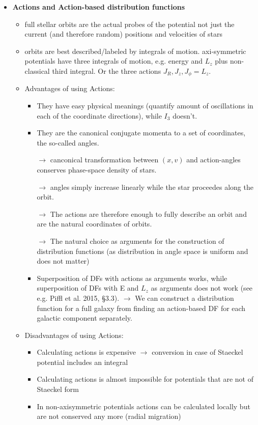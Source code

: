 \begin{itemize}
\item \textbf{Actions and Action-based distribution functions}
\begin{itemize}
\item full stellar orbits are the actual probes of the potential not just the current (and therefore random) positions and velocities of stars
\item orbits are best described/labeled by integrals of motion. axi-symmetric potentials have three integrals of motion, e.g. energy and $L_z$ plus non-classical third integral. Or the three actions $J_R, J_z, J_\phi=L_z$.
\item Advantages of using Actions: 
\begin{itemize}
\item They have easy physical meanings (quantify amount of oscillations in each of the coordinate directions), while $I_3$ doesn't.
\item They are the canonical conjugate momenta to a set of coordinates, the so-called angles.
\item[$\rightarrow$] canconical transformation between $(x,v)$ and action-angles conserves phase-space density of stars.
\item[$\rightarrow$] angles simply increase linearly while the star proceedes along the orbit.
\item[$\rightarrow$] The actions are therefore enough to fully describe an orbit and are the natural coordinates of orbits.
\item[$\rightarrow$] The natural choice as arguments for the construction of distribution functions (as distribution in angle space is uniform and does not matter)
\item Superposition of DFs with actions as arguments works, while superposition of DFs with E and $L_z$ as arguments does not work (see e.g. Piffl et al. 2015, §3.3). $\rightarrow$ We can construct a distribution function for a full galaxy from finding an action-based DF for each galactic component separately.
\end{itemize}
\item Disadvantages of using Actions:
\begin{itemize}
\item Calculating actions is expensive $\rightarrow$ conversion in case of Staeckel potential includes an integral
\item Calculating actions is almost impossible for potentials that are not of Staeckel form
\item In non-axisymmetric potentials actions can be calculated locally but are not conserved any more (radial migration)

\end{itemize}
\end{itemize}
\end{itemize}
